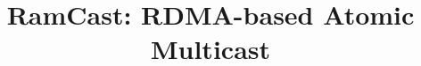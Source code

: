 \documentclass[10pt, conference, compsocconf]{IEEEtran}
\begin{document}
\title{RamCast: RDMA-based Atomic Multicast}
\date{}
\maketitle

% 













\newpage
\end{document}
